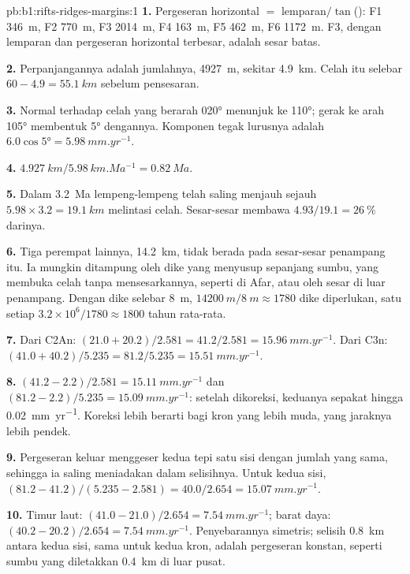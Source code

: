 \begin{solution}{pb:b1:rifts-ridges-margins:1}
\textbf{1.} Pergeseran horizontal $= $ lemparan$/\tan$(): F1 \qty{346}{m}, F2 \qty{770}{m},
F3 \qty{2014}{m}, F4 \qty{163}{m}, F5 \qty{462}{m}, F6 \qty{1172}{m}. F3, dengan
lemparan dan pergeseran horizontal terbesar, adalah sesar batas.

\textbf{2.} Perpanjangannya adalah jumlahnya, \qty{4927}{m}, sekitar \qty{4.9}{km}. Celah
itu selebar $60 - 4.9 = \qty{55.1}{km}$ sebelum pensesaran.

\textbf{3.} Normal terhadap celah yang berarah \ang{020} menunjuk ke \ang{110}; gerak ke
arah \ang{105} membentuk \ang{5} dengannya. Komponen tegak lurusnya adalah
$6.0\cos\ang{5} = \qty{5.98}{mm.yr^{-1}}$.

\textbf{4.} $\qty{4.927}{km}/\qty{5.98}{km.Ma^{-1}} = \qty{0.82}{Ma}$.

\textbf{5.} Dalam \qty{3.2}{Ma} lempeng-lempeng telah saling menjauh sejauh
$5.98\times3.2 = \qty{19.1}{km}$ melintasi celah. Sesar-sesar membawa
$4.93/19.1 = \qty{26}{\percent}$ darinya.

\textbf{6.} Tiga perempat lainnya, \qty{14.2}{km}, tidak berada pada sesar-sesar penampang
itu. Ia mungkin ditampung oleh dike yang menyusup sepanjang sumbu, yang membuka celah
tanpa mensesarkannya, seperti di Afar, atau oleh sesar di luar penampang. Dengan dike
selebar \qty{8}{m}, $\qty{14200}{m}/\qty{8}{m} \approx 1780$ dike diperlukan,
satu setiap $3.2\times10^6/1780 \approx 1800$ tahun rata-rata.

\textbf{7.} Dari C2An: $(21.0 + 20.2)/2.581 = 41.2/2.581 =
\qty{15.96}{mm.yr^{-1}}$. Dari C3n: $(41.0 + 40.2)/5.235 = 81.2/5.235 =
\qty{15.51}{mm.yr^{-1}}$.

\textbf{8.} $(41.2 - 2.2)/2.581 = \qty{15.11}{mm.yr^{-1}}$ dan
$(81.2 - 2.2)/5.235 = \qty{15.09}{mm.yr^{-1}}$: setelah dikoreksi, keduanya sepakat hingga
\qty{0.02}{mm.yr^{-1}}. Koreksi lebih berarti bagi kron yang lebih muda, yang jaraknya
lebih pendek.

\textbf{9.} Pergeseran keluar menggeser kedua tepi satu sisi dengan jumlah yang sama,
sehingga ia saling meniadakan dalam selisihnya. Untuk kedua sisi,
$(81.2 - 41.2)/(5.235 - 2.581) = 40.0/2.654 = \qty{15.07}{mm.yr^{-1}}$.

\textbf{10.} Timur laut: $(41.0 - 21.0)/2.654 = \qty{7.54}{mm.yr^{-1}}$;
barat daya: $(40.2 - 20.2)/2.654 = \qty{7.54}{mm.yr^{-1}}$. Penyebarannya simetris; selisih
\qty{0.8}{km} antara kedua sisi, sama untuk kedua kron, adalah pergeseran konstan, seperti
sumbu yang diletakkan \qty{0.4}{km} di luar pusat.


\end{solution}
